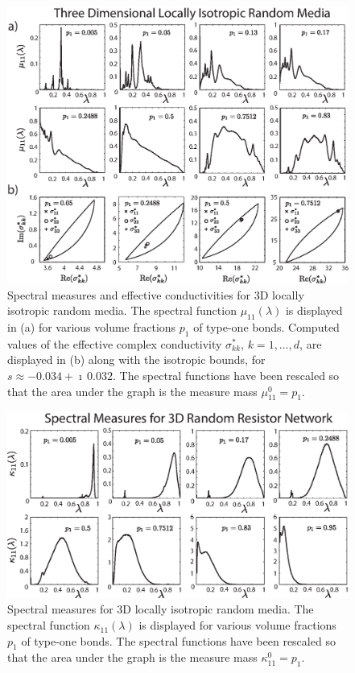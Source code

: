 \documentclass{cmslatex}
\begin{document}
%
\begin{figure}[t]
  \centerline{\includegraphics[scale=0.73]{3D_Spectral_Measures_Gamma.eps}} 
\caption{Spectral measures and effective conductivities for 3D locally
  isotropic random media. The spectral function $\mu_{11}(\lambda)$
  is displayed in (a) for various volume fractions $p_1$ of type-one
  bonds. Computed values of the effective complex conductivity
  $\sigma^*_{kk}$, $k=1,\ldots,d$, are displayed in (b) along with the isotropic
  bounds, for $s\approx-0.034+\imath\,0.032$. The spectral functions have been
  rescaled so that the area under the graph is the measure mass
  $\mu^0_{11}=p_1$.                  
        }
\label{fig:3D_Spectral_Measures}
\end{figure}
%

%
\begin{figure}[t]
  \centerline{\includegraphics[scale=0.73]{3D_Spectral_Measure_GammaCurl.eps}} 
\caption{Spectral measures for 3D locally isotropic random media. The
  spectral function $\kappa_{11}(\lambda)$ is displayed for various volume
  fractions $p_1$ of type-one bonds. The spectral functions have been
  rescaled so that the area under the graph is the measure mass
  $\kappa^0_{11}=p_1$.                  
        }
\label{fig:3D_Spectral_Measure_Curl}
\end{figure}
%
\end{document}
